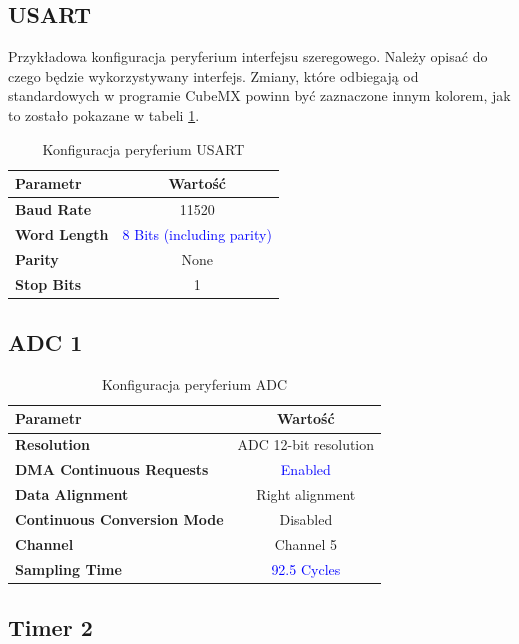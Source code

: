 \documentclass[10pt, a4paper]{article}
\begin{document}
\subsection{USART}

Przykładowa konfiguracja peryferium interfejsu szeregowego.
Należy opisać do czego będzie wykorzystywany interfejs. 
Zmiany, które odbiegają od standardowych w programie CubeMX 
powinn być zaznaczone innym kolorem, jak to zostało pokazane 
w tabeli \ref{tab:USART}.

\begin{table}[H]
	\centering
	\begin{tabular}{|l|c|} \hline
		\textbf{Parametr} & Wartość \\
		\hline
		\hline  \textbf{Baud Rate}&11520  \\\hline
		\textbf{Word Length } & \textcolor{blue}{8 Bits (including parity)}\\\hline
		\textbf{Parity} &  None\\
		\hline
		\textbf{Stop Bits}& 1\\
		\hline
	\end{tabular}
	\caption{Konfiguracja peryferium USART}
	\label{tab:USART}
\end{table}

\subsection{ADC 1}

\begin{table}[H]
	\centering
	\begin{tabular}{|l|c|} \hline
		\textbf{Parametr} & Wartość \\
		\hline
		\hline  \textbf{Resolution}&ADC 12-bit resolution  \\\hline
		\textbf{DMA Continuous Requests} & \textcolor{blue}{Enabled}\\\hline
		\textbf{Data Alignment} &  Right alignment\\
		\hline
		\textbf{Continuous Conversion Mode}& Disabled\\
		\hline
		\textbf{Channel}& Channel 5\\
		\hline
		\textbf{Sampling Time}& \textcolor{blue}{92.5 Cycles}\\
		\hline
	\end{tabular}
	\caption{Konfiguracja peryferium ADC}
	\label{tab:ADC}
\end{table}

\subsection{Timer 2}
\end{document}
